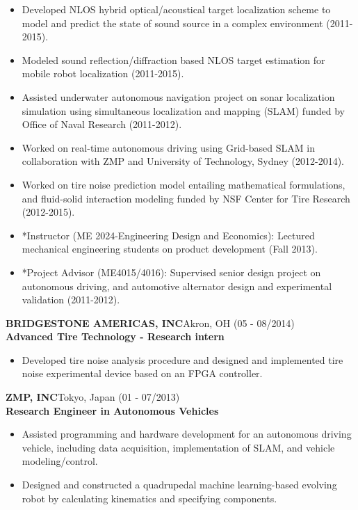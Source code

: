 \documentclass[11pt,letterpaper]{article}
\begin{document}
\begin{itemize}
\item Developed NLOS hybrid optical/acoustical target localization scheme to model and predict the state of sound source in a complex environment (2011-2015).
\item Modeled sound reflection/diffraction based NLOS target estimation for mobile robot localization (2011-2015).
\item Assisted underwater autonomous navigation project on sonar localization simulation using simultaneous localization and mapping (SLAM) funded by Office of Naval Research (2011-2012).
\item Worked on real-time autonomous driving using Grid-based SLAM in collaboration with ZMP and University of Technology, Sydney (2012-2014).
\item Worked on tire noise prediction model entailing mathematical formulations, and fluid-solid interaction modeling funded by NSF Center for Tire Research (2012-2015).
\item *Instructor (ME 2024-Engineering Design and Economics): Lectured mechanical engineering students on product development (Fall 2013).
\item *Project Advisor (ME4015/4016): Supervised senior design project on autonomous driving, and automotive alternator design and experimental validation (2011-2012). 
\end{itemize}

\MakeUppercase{\bf Bridgestone Americas, Inc}\hfill{Akron, OH}{ (05 - 08/2014)}\\
{\bf Advanced Tire Technology - Research intern}
\begin{itemize}
\item Developed tire noise analysis procedure and designed and implemented tire noise experimental device based on an FPGA controller.
\end{itemize}

\MakeUppercase{\bf ZMP, Inc}\hfill{Tokyo, Japan }{(01 - 07/2013)}\\
{\bf Research Engineer in Autonomous Vehicles}
\begin{itemize}
\item Assisted programming and hardware development for an autonomous driving vehicle, including data acquisition, implementation of SLAM, and vehicle modeling/control.
\item Designed and constructed a quadrupedal machine learning-based evolving robot by calculating kinematics and specifying components.
\end{itemize}
\end{document}
